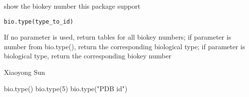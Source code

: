 \begin{Description}\relax
show the biokey number this package support
\end{Description}
\begin{Usage}
\begin{verbatim}
bio.type(type_to_id)
\end{verbatim}
\end{Usage}
\begin{Arguments}
\begin{ldescription}
\item[\code{type\_to\_id}] If no parameter is used, return tables for all biokey numbers;
if parameter is number from bio.type(), return the corresponding biological type; if 
parameter is biological type, return the corresponding biokey number
\end{ldescription}
\end{Arguments}
\begin{Author}\relax
Xiaoyong Sun
\end{Author}
\begin{Examples}
\begin{ExampleCode}

bio.type()
bio.type(5)
bio.type("PDB id")

\end{ExampleCode}
\end{Examples}

